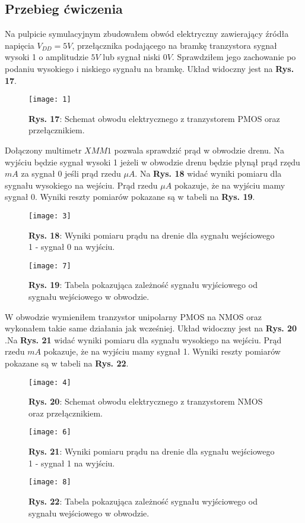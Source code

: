 \documentclass[11pt]{article}
\begin{document}
\subsection{Przebieg ćwiczenia}
Na pulpicie symulacyjnym zbudowałem obwód elektryczny zawierający źródła napięcia $V_{DD}=5V$, przełącznika podającego na bramkę tranzystora sygnał wysoki 1 o amplitudzie $5V$ lub sygnał niski $0V$. Sprawdziłem jego zachowanie
po podaniu wysokiego i niskiego sygnału na bramkę. Układ widoczny jest na \textbf{Rys. 17}.
\begin{figure}[H]
\centering
\texttt{[image: 1]}
\caption*{\textbf{Rys. 17}: Schemat obwodu elektrycznego z tranzystorem PMOS oraz przełącznikiem. }
\end{figure}
\noindent Dołączony multimetr $XMM1$ pozwala sprawdzić prąd w obwodzie drenu. Na wyjściu będzie sygnał wysoki 1 jeżeli w obwodzie drenu będzie płynął prąd rzędu $mA$ za sygnał 0 jeśli prąd rzedu ${\mu}A$. Na \textbf{Rys. 18} widać wyniki
pomiaru dla sygnału wysokiego na wejściu. Prąd rzedu ${\mu}A$ pokazuje, że na wyjściu mamy sygnał 0. Wyniki reszty pomiarów pokazane są w tabeli na \textbf{Rys. 19}.
\begin{figure}[H]
\centering
\texttt{[image: 3]}
\caption*{\textbf{Rys. 18}: Wyniki pomiaru prądu na drenie dla sygnału wejściowego 1 - sygnał 0 na wyjściu. }
\end{figure}
\begin{figure}[H]
\centering
\texttt{[image: 7]}
\caption*{\textbf{Rys. 19}: Tabela pokazująca zależność sygnału wyjściowego od sygnału wejściowego w obwodzie. }
\end{figure}
\noindent W obwodzie wymieniłem tranzystor unipolarny PMOS na NMOS oraz wykonałem takie same działania jak wcześniej. Układ widoczny jest na \textbf{Rys. 20} .Na \textbf{Rys. 21} widać wyniki pomiaru dla sygnału wysokiego na wejściu. Prąd rzedu $mA$ pokazuje, że na wyjściu mamy sygnał 1. Wyniki reszty pomiarów pokazane są w tabeli na \textbf{Rys. 22}.
\begin{figure}[H]
\centering
\texttt{[image: 4]}
\caption*{\textbf{Rys. 20}: Schemat obwodu elektrycznego z tranzystorem NMOS oraz przełącznikiem.}
\end{figure}
\begin{figure}[H]
\centering
\texttt{[image: 6]}
\caption*{\textbf{Rys. 21}: Wyniki pomiaru prądu na drenie dla sygnału wejściowego 1 - sygnał 1 na wyjściu. }
\end{figure}
\begin{figure}[H]
\centering
\texttt{[image: 8]}
\caption*{\textbf{Rys. 22}: Tabela pokazująca zależność sygnału wyjściowego od sygnału wejściowego w obwodzie. }
\end{figure}
\end{document}

